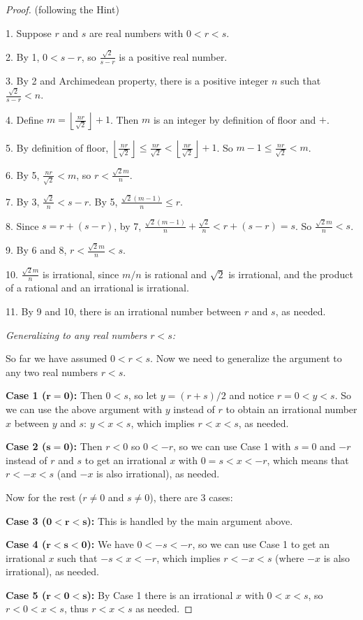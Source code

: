 \documentclass[14pt]{extarticle}
\newcommand{\dps}{\displaystyle}
\newcommand{\floor}[1]{{\left\lfloor#1\right\rfloor}}
\begin{document}
\begin{proof}
(following the Hint)

1. Suppose $r$ and $s$ are real numbers with \(0 < r < s\).

2. By 1, \(0 < s - r\), so \(\dps \frac{\sqrt{2}}{s-r}\) is a positive real number.

3. By 2 and Archimedean property, there is a positive integer $n$ such that \(\dps \frac{\sqrt{2}}{s-r} < n\).

4. Define \(\dps m = \floor{\frac{nr}{\sqrt{2}}} + 1\). Then $m$ is an integer by definition of floor and $+$.

5. By definition of floor, \(\dps \floor{\frac{nr}{\sqrt{2}}} \leq \frac{nr}{\sqrt{2}} < \floor{\frac{nr}
{\sqrt{2}}}+1\). So \(\dps m-1 \leq\frac{nr}{\sqrt{2}}<m\).

6. By 5, \(\dps\frac{nr}{\sqrt{2}} < m\), so \(\dps r < \frac{\sqrt{2}m}{n}\).

7. By 3, \(\dps \frac{\sqrt{2}}{n} < s-r\). By 5, \(\dps \frac{\sqrt{2}(m-1)}{n} \leq r\).

8. Since \(s = r + (s-r)\), by 7, \(\dps \frac{\sqrt{2}(m-1)}{n} + \frac{\sqrt{2}}{n} < r + (s-r) = s\). So
\(\dps \frac{\sqrt{2}m}{n} < s\).

9. By 6 and 8, \(\dps r < \frac{\sqrt{2}m}{n} < s\). 

10. \(\dps \frac{\sqrt{2}m}{n}\) is irrational, since $m/n$ is rational and $\sqrt{2}$ is irrational, and the product 
of a rational and an irrational is irrational.

11. By 9 and 10, there is an irrational number between $r$ and $s$, as needed.

{\it Generalizing to any real numbers $r < s$:}

So far we have assumed \(0 < r < s\). Now we need to generalize the argument to any two real numbers $r < s$. 

{\bf Case 1 ($\bm{r = 0}$):} Then $0 < s$, so let \(y = (r+s) / 2\) and notice $r = 0 < y < s$. So we can use the 
above argument with $y$ instead of $r$ to obtain an irrational number $x$ between $y$ and $s$: \(y < x < s\), 
which implies \(r < x < s\), as needed.

{\bf Case 2 ($\bm{s = 0}$):} Then $r < 0$ so $0 < -r$, so we can use Case 1 with $s = 0$ and $-r$ instead of $r$ and 
$s$ to get an irrational $x$ with \(0 = s < x < -r\), which means that \(r < -x < s\) (and $-x$ is also irrational), 
as needed.

Now for the rest ($r \neq 0$ and $s \neq 0$), there are 3 cases:

{\bf Case 3 (\(\bm{0 < r < s}\)):} This is handled by the main argument above.

{\bf Case 4 (\(\bm{r < s < 0}\)):} We have \(0 < -s < -r\), so we can use Case 1 to get an irrational $x$ such that
\(-s < x < -r\), which implies \(r < -x < s\) (where $-x$ is also irrational), as needed.

{\bf Case 5 (\(\bm{r < 0 < s}\)):} By Case 1 there is an irrational $x$ with \(0 < x < s\), so \(r < 0 < x < s\),
thus \(r < x < s\) as needed.
\end{proof}
\end{document}
